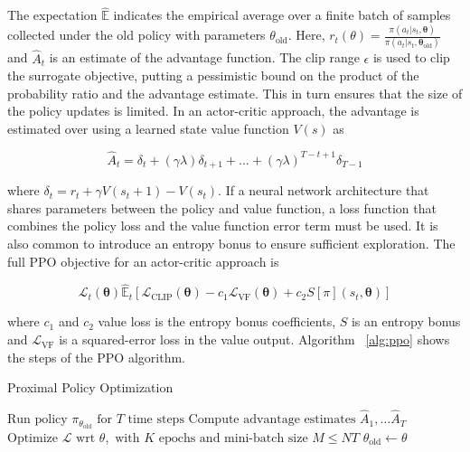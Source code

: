 The expectation \(\mathbb{\hat{E}}\) indicates the empirical average over a finite batch of samples collected under the old policy with parameters \(\theta_{\text{old}}\).
Here, \(r_t(\theta) = \frac{\pi(a_t | s_t, \boldsymbol{\theta})}{\pi(a_t | s_t, \boldsymbol{\theta}_{\text{old}})}\) and \(\hat{A}_t\) is an estimate 
of the advantage function.
The clip range \(\epsilon\) is used to clip the surrogate objective,
putting a pessimistic bound on the product of the probability ratio and the advantage estimate.
This in turn ensures that the size of the policy updates is limited.
In an actor-critic approach, the advantage is estimated over using a learned state value function \(V(s)\) as 

\[
    \hat{A}_t = \delta_t + (\gamma\lambda) \delta_{t+1} + \dots + (\gamma\lambda)^{T-t+1} \delta_{T-1}
\]

where \(\delta_t = r_t + \gamma V(s_t+1) - V(s_t)\). If a neural network architecture that shares parameters between the policy and value function, a loss function that combines the policy loss and the value function error term must be used.
It is also common to introduce an entropy bonus to ensure sufficient exploration.
The full PPO objective for an actor-critic approach is

\[
    \mathcal{L}_t(\boldsymbol{\theta})
    \hat{\mathbb{E}}_t
    \left\lbrack
    \mathcal{L}_\text{CLIP}(\boldsymbol{\theta}) -
    c_1 \mathcal{L}_\text{VF}(\boldsymbol{\theta}) +
    c_2 S [\pi](s_t, \boldsymbol{\theta})
    \right\rbrack
\]

where \(c_1\) and \(c_2\) value loss is the entropy bonus coefficients,
\(S\) is an entropy bonus and \(\mathcal{L}_\text{VF}\) is a squared-error loss in the value output. Algorithm ~\ref{alg:ppo} shows the steps of the PPO algorithm.

\begin{algorithm}
    \label{alg:ppo}
    \caption{Proximal Policy Optimization}
    \begin{algorithmic}
                \State \(\text{Run policy } \pi_{\theta_\text{old}} \text{ for } T \text{ time steps}\)
                \State \(\text{Compute advantage estimates } \hat{A}_1, \dots \hat{A}_T\)
            \EndFor
            \State \(\text{Optimize } \mathcal{L} \text{ wrt } \theta, \text{ with } K \text{ epochs and mini-batch size } M \leq NT\)
            \State \(\theta_{\text{old}} \leftarrow \theta\)
        \EndFor
    \end{algorithmic}
\end{algorithm}


